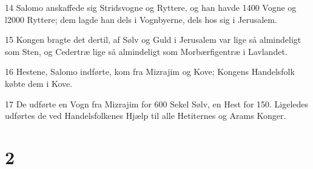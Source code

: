 \par 14 Salomo anskaffede sig Stridsvogne og Ryttere, og han havde 1400 Vogne og l2000 Ryttere; dem lagde han dels i Vognbyerne, dels hos sig i Jerusalem.
\par 15 Kongen bragte det dertil, af Sølv og Guld i Jerusalem var lige så almindeligt som Sten, og Cedertræ lige så almindeligt som Morbærfigentræ i Lavlandet.
\par 16 Hestene, Salomo indførte, kom fra Mizrajim og Kove; Kongens Handelsfolk købte dem i Kove.
\par 17 De udførte en Vogn fra Mizrajim for 600 Sekel Sølv, en Hest for 150. Ligeledes udførtes de ved Handelsfolkenes Hjælp til alle Hetiternes og Arams Konger.

\chapter{2}


